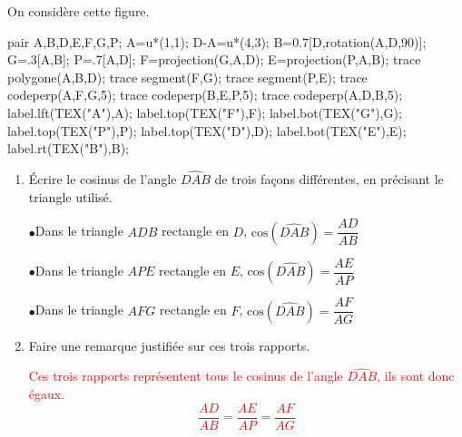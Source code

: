 \begin{corrige}
    On considère cette figure.

    \begin{center}
        \begin{Geometrie}
            pair A,B,D,E,F,G,P;
            A=u*(1,1);
            D-A=u*(4,3);
            B=0.7[D,rotation(A,D,90)];            
            G=.3[A,B];
            P=.7[A,D];
            F=projection(G,A,D);
            E=projection(P,A,B);
            trace polygone(A,B,D);
            trace segment(F,G);
            trace segment(P,E);
            trace codeperp(A,F,G,5);
            trace codeperp(B,E,P,5);
            trace codeperp(A,D,B,5);
            label.lft(TEX("A"),A);
            label.top(TEX("F"),F);
            label.bot(TEX("G"),G);
            label.top(TEX("P"),P);
            label.top(TEX("D"),D);
            label.bot(TEX("E"),E);
            label.rt(TEX("B"),B);
        \end{Geometrie}
    \end{center}
    \begin{enumerate}
        \item Écrire le cosinus de l'angle $\widehat{DAB}$ de trois façons différentes, en précisant le triangle utilisé.
        
        {\color{red}
        \begin{itemize}
            \def\item{$\bullet$}
            \item Dans le triangle $ADB$ rectangle en $D$, $\text{cos}(\widehat{DAB})=\dfrac{AD}{AB}$
            
            \item Dans le triangle $APE$ rectangle en $E$, $\text{cos}(\widehat{DAB})=\dfrac{AE}{AP}$
            
            \item Dans le triangle $AFG$ rectangle en $F$, $\text{cos}(\widehat{DAB})=\dfrac{AF}{AG}$
        \end{itemize}
        }
        \item Faire une remarque justifiée sur ces trois rapports.
        
        \textcolor{red}{Ces trois rapports représentent tous le cosinus de l'angle $\widehat{DAB}$, ils sont donc égaux. $$\dfrac{AD}{AB}=\dfrac{AE}{AP}=\dfrac{AF}{AG}$$}
    \end{enumerate}
\end{corrige}

